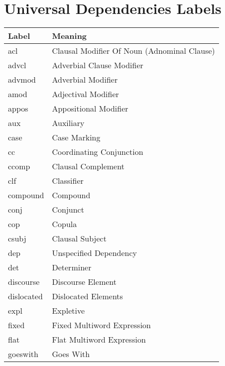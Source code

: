 \section{Universal Dependencies Labels} \label{ud_labels}
\begin{supertabular}{| p{.20\textwidth} | p{.80\textwidth} |}
            \hline
            \textbf{Label} & \textbf{Meaning} \\
            \hline
            acl & Clausal Modifier Of Noun (Adnominal Clause) \\
            \hline
            advcl & Adverbial Clause Modifier \\
            \hline
            advmod & Adverbial Modifier \\
            \hline
            amod & Adjectival Modifier \\
            \hline
            appos & Appositional Modifier \\
            \hline
            aux & Auxiliary \\
            \hline
            case & Case Marking \\
            \hline
            cc & Coordinating Conjunction \\
            \hline
            ccomp & Clausal Complement \\
            \hline
            clf & Classifier \\
            \hline
            compound & Compound \\
            \hline
            conj & Conjunct \\
            \hline
            cop & Copula \\
            \hline
            csubj & Clausal Subject \\
            \hline
            dep & Unspecified Dependency \\
            \hline
            det & Determiner \\
            \hline
            discourse & Discourse Element \\
            \hline
            dislocated & Dislocated Elements \\
            \hline
            expl & Expletive \\
            \hline
            fixed & Fixed Multiword Expression \\
            \hline
            flat & Flat Multiword Expression \\
            \hline
            goeswith & Goes With \\

\end{supertabular}
